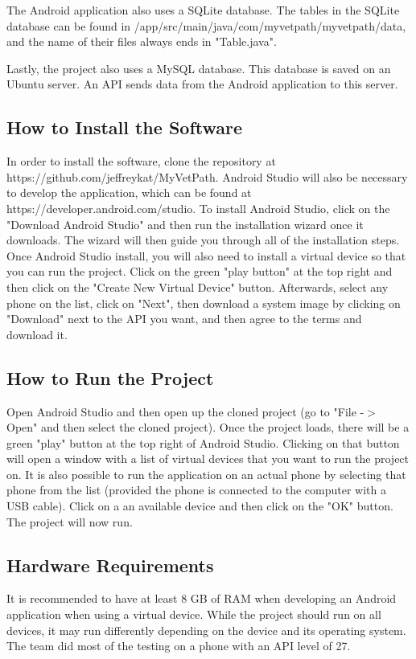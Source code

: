\documentclass[onecolumn, draftclsnofoot,10pt, compsoc]{IEEEtran}
\begin{document}
The Android application also uses a SQLite database. The tables in the SQLite database can be found in /app/src/main/java/com/myvetpath/myvetpath/data, and the name of their files always ends in "Table.java". 

Lastly, the project also uses a MySQL database. This database is saved on an Ubuntu server. An API sends data from the Android application to this server.

 \subsection{How to Install the Software}
 In order to install the software, clone the repository at https://github.com/jeffreykat/MyVetPath. Android Studio will also be necessary to develop the application, which can be found at https://developer.android.com/studio. To install Android Studio, click on the "Download Android Studio" and then run the installation wizard once it downloads. The wizard will then guide you through all of the installation steps. Once Android Studio install, you will also need to install a virtual device so that you can run the project. Click on the green "play button" at the top right and then click on the "Create New Virtual Device" button. Afterwards, select any phone on the list, click on "Next", then download a system image by clicking on "Download" next to the API you want, and then agree to the terms and download it. 
 
 \subsection{How to Run the Project}
 Open Android Studio and then open up the cloned project (go to "File -$>$ Open" and then select the cloned project). Once the project loads, there will be a green "play" button at the top right of Android Studio. Clicking on that button will open a window with a list of virtual devices that you want to run the project on. It is also possible to run the application on an actual phone by selecting that phone from the list (provided the phone is connected to the computer with a USB cable). Click on a an available device and then click on the "OK" button. The project will now run.
 
 \subsection{Hardware Requirements}
 It is recommended to have at least 8 GB of RAM when developing an Android application when using  a virtual device. While the project should run on all devices, it may run differently depending on the device and its operating system. The team did most of the testing on a phone with an API level of 27.
 
\end{document}
